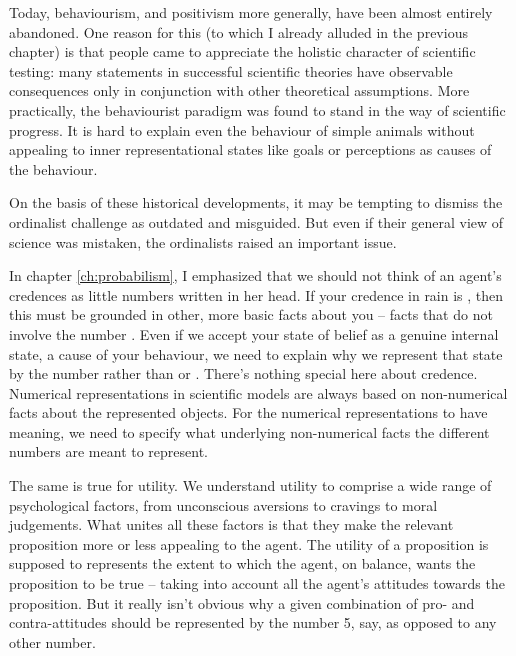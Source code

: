 Today, behaviourism, and positivism more generally, have been almost
entirely abandoned. One reason for this (to which I already alluded in
the previous chapter) is that people came to appreciate the holistic
character of scientific testing: many statements in successful
scientific theories have observable consequences only in conjunction
with other theoretical assumptions.%
%
More practically, the behaviourist paradigm was found to stand in the
way of scientific progress. It is hard to explain even the behaviour
of simple animals without appealing to inner representational states
like goals or perceptions as causes of the behaviour.

On the basis of these historical developments, it may be tempting to dismiss the
ordinalist challenge as outdated and misguided. But even if their general view
of science was mistaken, the ordinalists raised an important issue.

In chapter \ref{ch:probabilism}, I emphasized that we should not think
of an agent's credences as little numbers written in her head. If your
credence in rain is , then this must be grounded in
other, more basic facts about you -- facts that do not involve the
number . Even if we accept your state of belief as a
genuine internal state, a cause of your behaviour, we need to explain
why we represent that state by the number  rather than
 or . There's nothing special here
about credence. Numerical representations in scientific models are
always based on non-numerical facts about the represented objects. For
the numerical representations to have meaning, we need to specify what
underlying non-numerical facts the different numbers are meant to
represent.

The same is true for utility. We understand utility to comprise a wide range of
psychological factors, from unconscious aversions to cravings to moral
judgements. What unites all these factors is that they make the relevant
proposition more or less appealing to the agent. The utility of a proposition is
supposed to represents the extent to which the agent, on balance, wants the
proposition to be true -- taking into account all the agent's attitudes towards
the proposition. But it really isn't obvious why a given combination of pro- and
contra-attitudes should be represented by the number 5, say, as opposed to any
other number.

